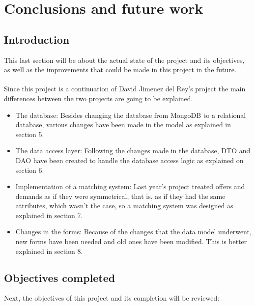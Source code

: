 \documentclass[11pt]{book}
\begin{document}
\chapter{Conclusions and future work}
\section{Introduction}
This last section will be about the actual state of the project and its objectives, as well as the improvements that could be made in this project in the future.\\\\
Since this project is a continuation of David Jimenez del Rey's project the main differences between the two projects are going to be explained.
\begin{itemize}
	\item The database: Besides changing the database from MongoDB to a relational database, various changes have been made in the model as explained in section 5.
	\item The data access layer: Following the changes made in the database, DTO and DAO have been created to handle the database access logic as explained on section 6.
	\item Implementation of a matching system: Last year's project treated offers and demands as if they were symmetrical, that is, as if they had the same attributes, which wasn't the case, so a matching system was designed as explained in section 7.
	\item Changes in the forms: Because of the changes that the data model underwent, new forms have been needed and old ones have been modified. This is better explained in section 8.
\end{itemize}

\section{Objectives completed}
Next, the objectives of this project and its completion will be reviewed:
\end{document}

